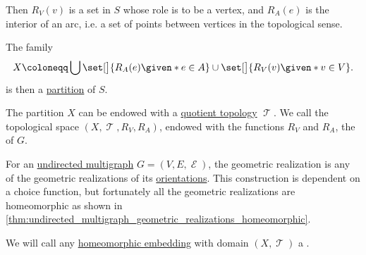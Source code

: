 \begin{definition}
  Then \( R_V(v) \) is a set in \( S \) whose role is to be a vertex, and \( R_A(e) \) is the interior of an arc, i.e. a set of points between vertices in the topological sense.

  The family
  \begin{equation*}
    X \coloneqq \bigcup \set[\big]{ R_A(e) \given* e \in A } \cup \set[\big]{ R_V(v) \given* v \in V }.
  \end{equation*}
  is then a \hyperref[def:set_partition]{partition} of \( S \).

  The partition \( X \) can be endowed with a \hyperref[def:topological_quotient]{quotient topology} \( \mscrT \). We call the topological space \( (X, \mscrT, R_V, R_A) \), endowed with the functions \( R_V \) and \( R_A \), the  of \( G \).

  \begin{thmenum}
     For an \hyperref[def:hypergraph/multigraph]{undirected multigraph} \( G = (V, E, \mscrE) \), the geometric realization is any of the geometric realizations of its \hyperref[def:multigraph_orientation]{orientations}. This construction is dependent on a choice function, but fortunately all the geometric realizations are homeomorphic as shown in \cref{thm:undirected_multigraph_geometric_realizations_homeomorphic}.

     We will call any \hyperref[def:homeomorphism]{homeomorphic embedding} with domain \( (X, \mscrT) \) a .
  \end{thmenum}
\end{definition}

